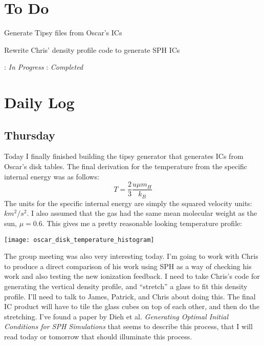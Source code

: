 \documentclass[11pt,letterpaper]{article}
\begin{document}
\section{To Do}
\begin{bullets}
\item[\checkmark] Generate Tipsy files from Oscar's ICs
\item Rewrite Chris' density profile code to generate SPH ICs
\end{bullets}

\textleaf : \textit{In Progress} \qquad \checkmark : \textit{Completed}
\section{Daily Log}

\subsection{Thursday}

Today I finally finished building the tipsy generator that generates ICs
from Oscar's disk tables. The final derivation for the temperature from
the specific internal energy was as follows:
\[T = \frac{2}{3}\frac{u\mu m_H}{k_B}\] The units for the specific
internal energy are simply the squared velocity units: $km^2/s^2$. I
also assumed that the gas had the same mean molecular weight as the sun,
$\mu = 0.6$. This gives me a pretty reasonable looking temperature
profile:

\texttt{[image: oscar\_disk\_temperature\_histogram]}

The group meeting was also very interesting today. I'm going to work
with Chris to produce a direct comparison of his work using SPH as a way
of checking his work and also testing the new ionization feedback. I
need to take Chris's code for generating the vertical density profile,
and ``stretch'' a glass to fit this density profile. I'll need to talk
to James, Patrick, and Chris about doing this. The final IC product will
have to tile the glass cubes on top of each other, and then do the
stretching. I've found a paper by Dieh et al. \emph{Generating Optimal
Initial Conditions for SPH Simulations} that seems to describe this
process, that I will read today or tomorrow that should illuminate this
process.
\end{document}
